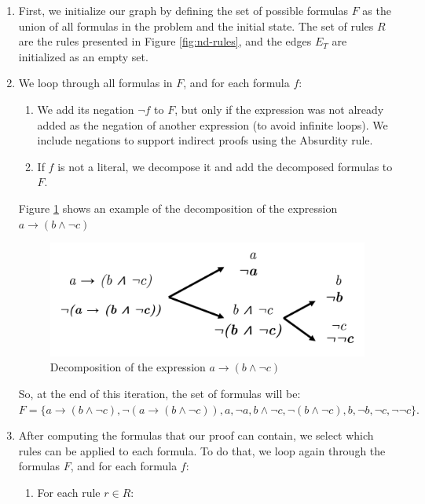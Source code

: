 \documentclass[runningheads]{llncs}
\begin{document}
\begin{enumerate}
    \item First, we initialize our graph by defining the set of possible formulas \(F\) as the union of all formulas in the problem and the initial state. The set of rules \(R\) are the rules presented in Figure \ref{fig:nd-rules}, and the edges \(E_T\) are initialized as an empty set.

    \item We loop through all formulas in \(F\), and for each formula \(f\):

    \begin{enumerate}
         \item We add its negation \(\lnot f\) to \(F\), but only if the expression was not already added as the negation of another expression (to avoid infinite loops). We include negations to support indirect proofs using the Absurdity rule.
         \item If \(f\) is not a literal, we decompose it and add the decomposed formulas to \(F\).
    \end{enumerate}

    Figure \ref{fig:tg-exps} shows an example of the decomposition of the expression \(a \to ( b \land \lnot c)\) 
    \begin{figure}
        \centering
        \includegraphics[width=0.6\linewidth]{resources/decomposition.jpg}
        \caption{Decomposition of the expression \(a \to ( b \land \lnot c)\)}
        \label{fig:tg-exps}
    \end{figure}

    So, at the end of this iteration, the set of formulas will be: \(
    F = \{ a \to ( b \land \lnot c), \lnot(a \to ( b \land \lnot c)), a, \lnot a, b \land \lnot c, \lnot(b \land \lnot c), b, \lnot b, \lnot c, \lnot\lnot c \}.
    \)

    \item After computing the formulas that our proof can contain, we select which rules can be applied to each formula. To do that, we loop again through the formulas \(F\), and for each formula \(f\):

       \begin{enumerate}
            \item For each rule \(r \in R\):


\end{enumerate}
\end{enumerate}
\end{document}
